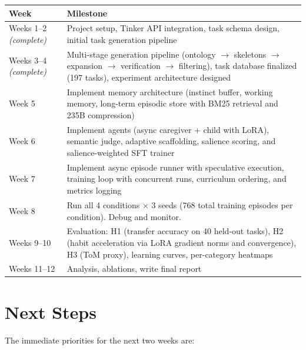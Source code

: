\documentclass[11pt]{article}
\begin{document}
\begin{center}
\begin{tabular}{p{2.5cm}p{10cm}}
\toprule
\textbf{Week} & \textbf{Milestone} \\
\midrule
Weeks 1--2 \newline \textit{(complete)} & Project setup, Tinker API integration, task schema design, initial task generation pipeline \\[0.5em]
Weeks 3--4 \newline \textit{(complete)} & Multi-stage generation pipeline (ontology $\to$ skeletons $\to$ expansion $\to$ verification $\to$ filtering), task database finalized (197 tasks), experiment architecture designed \\[0.5em]
Week 5 & Implement memory architecture (instinct buffer, working memory, long-term episodic store with BM25 retrieval and 235B compression) \\[0.5em]
Week 6 & Implement agents (async caregiver + child with LoRA), semantic judge, adaptive scaffolding, salience scoring, and salience-weighted SFT trainer \\[0.5em]
Week 7 & Implement async episode runner with speculative execution, training loop with concurrent runs, curriculum ordering, and metrics logging \\[0.5em]
Week 8 & Run all 4 conditions $\times$ 3 seeds (768 total training episodes per condition). Debug and monitor. \\[0.5em]
Weeks 9--10 & Evaluation: H1 (transfer accuracy on 40 held-out tasks), H2 (habit acceleration via LoRA gradient norms and convergence), H3 (ToM proxy), learning curves, per-category heatmaps \\[0.5em]
Weeks 11--12 & Analysis, ablations, write final report \\
\bottomrule
\end{tabular}
\end{center}

\section{Next Steps}

The immediate priorities for the next two weeks are:
\end{document}
